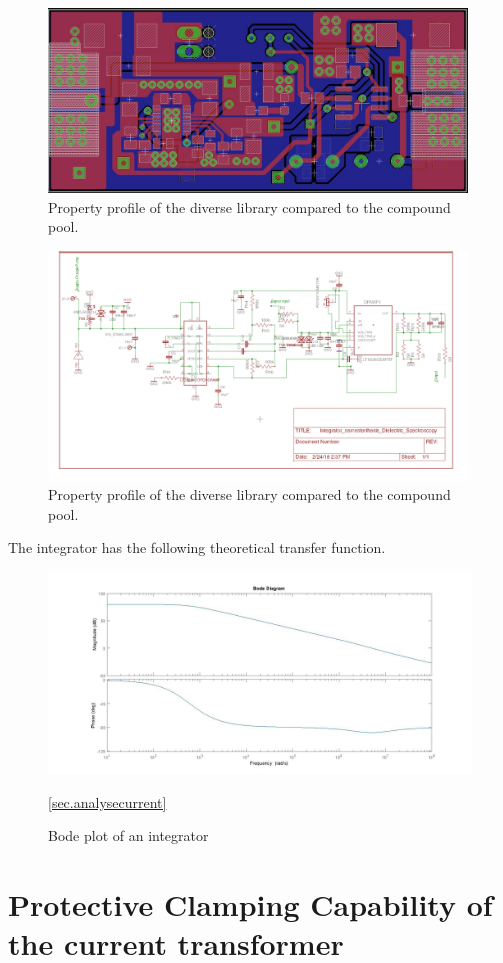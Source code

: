 \begin{figure}
\includegraphics[width=0.99\textwidth]{figures/Method/integrator/PCB_Integrator.png}
    \caption{Property profile of the diverse library compared to the compound pool.}
    
    \end{figure}	
    
    
    \newpage
    
    	\begin{figure}
\includegraphics[width=0.99\textwidth]{figures/Method/integrator/schematic.jpg}
 \caption{Property profile of the diverse library compared to the compound pool.}
  \end{figure}	

The integrator has the following theoretical transfer function.

\begin{figure}

\includegraphics[width=\textwidth]{figures/Method/integrator/transferfunction_int.jpg}

\caption[Kurze Abbildungsbeschreibung]{Bode plot of an integrator } \ref{sec.analysecurrent}
\end{figure}
	



\section{Protective Clamping Capability of the current transformer}

